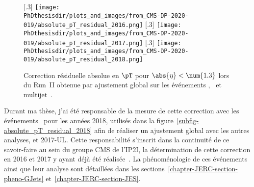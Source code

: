 \begin{figure}[h]
\centering
{}[.3\textwidth]
{\texttt{[image: \\PhDthesisdir/plots\_and\_images/from\_CMS-DP-2020-019/absolute\_pT\_residual\_2016.png]}}
\hfill
{}[.3\textwidth]
{\texttt{[image: \\PhDthesisdir/plots\_and\_images/from\_CMS-DP-2020-019/absolute\_pT\_residual\_2017.png]}}
\hfill
{}[.3\textwidth]
{\texttt{[image: \\PhDthesisdir/plots\_and\_images/from\_CMS-DP-2020-019/absolute\_pT\_residual\_2018.png]}}
\caption[Correction résiduelle absolue en $\pT$ pour $\abs{\eta}<\num{1.3}$ lors du Run~II.]{Correction résiduelle absolue en $\pT$ pour $\abs{\eta}<\num{1.3}$ lors du Run~II obtenue par ajustement global sur les événements \Gjets, \Zjets\ et multijet~\cite{CMS-DP-2020-019}.}
\label{fig-L3ResAbs_RunII}
\end{figure}
\par Durant ma thèse, j'ai été responsable de la mesure de cette correction avec les événements \Gjets\ pour les années 2018, utilisés dans la figure~\ref{subfig-absolute_pT_residual_2018} afin de réaliser un ajustement global avec les autres analyses, et 2017-UL.
Cette responsabilité s'inscrit dans la continuité de ce savoir-faire au sein du groupe CMS de l'IP2I, la détermination de cette correction en 2016 et 2017 y ayant déjà été réalisée~\cite{Hugues_thesis}.
La phénoménologie de ces événements ainsi que leur analyse sont détaillées dans les sections~\ref{chapter-JERC-section-pheno-GJets} et~\ref{chapter-JERC-section-JES}.

